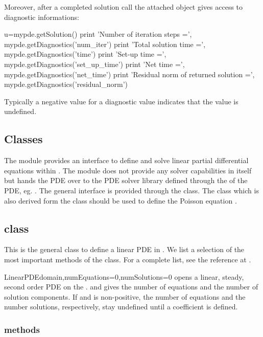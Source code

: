 Moreover, after a completed solution call
the attached  \SolverOptions object gives access to diagnostic informations: 
\begin{python}
u=mypde.getSolution()
print 'Number of iteration steps =', mypde.getDiagnostics('num_iter')
print 'Total solution time =', mypde.getDiagnostics('time')
print 'Set-up time =', mypde.getDiagnostics('set_up_time')
print 'Net time =', mypde.getDiagnostics('net_time')
print 'Residual norm of returned solution =', mypde.getDiagnostics('residual_norm')
\end{python}
Typically a negative value for a diagnostic value indicates that the value is undefined.

\subsection{Classes}
The module \linearPDEs provides an interface to define and solve linear partial
differential equations within \escript. The module \linearPDEs does not provide any
solver capabilities in itself but hands the PDE over to
the PDE solver library defined through the \Domain of the PDE, eg. \finley.
The general interface is provided through the \LinearPDE class. The \Poisson
class which is also derived form the \LinearPDE class should be used
to define the Poisson equation .

\subsection{\LinearPDE class}
This is the general class to define a linear PDE in \escript. We list a selection of the most
important methods of the class. For a complete list, see the reference at \ReferenceGuide.

\begin{classdesc}{LinearPDE}{domain,numEquations=0,numSolutions=0}
opens a linear, steady, second order PDE on the \Domain {}. 
and  gives the number of equations and the number of solution components.
If  and  is non-positive, the number of equations
and the number solutions, respectively, stay undefined until a coefficient is
defined.
\end{classdesc}

\subsubsection{\LinearPDE methods}

